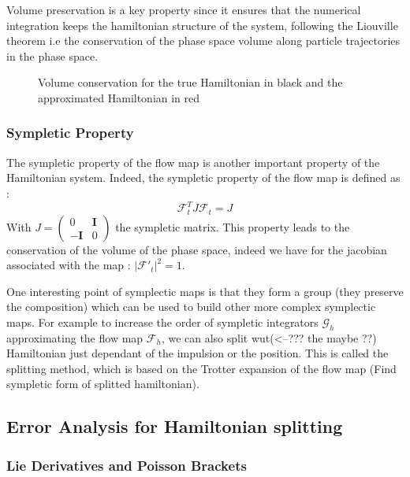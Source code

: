 \documentclass[ansiapaper]{report}
\begin{document}
\begin{multicols}{3}
  Volume preservation is a key property since it ensures that the numerical integration keeps the hamiltonian structure of the system, following the Liouville theorem i.e the conservation of the phase space volume along particle trajectories in the phase space.

  \begin{figure}[H]
    \def\svgwidth{\linewidth}
    
    \caption{Volume conservation for the true Hamiltonian in black and the approximated Hamiltonian in red}
    \vspace{0.15cm}
  \end{figure}

  \subsubsection{Sympletic Property}
  The sympletic property of the flow map is another important property of the Hamiltonian system. Indeed, the sympletic property of the flow map is defined as :
  $$ \mathcal{F}_t^T J \mathcal{F}_t = J$$
  With $J = \begin{pmatrix}
      0           & \textbf{I} \\
      -\textbf{I} & 0
    \end{pmatrix}$ the sympletic matrix. This property leads to the conservation of the volume of the phase space, indeed we have  for the jacobian associated with the map : $\lvert \mathcal{F'}_t\rvert^2 = 1 $.

  One interesting point of symplectic maps is that they form a group (they preserve the composition) which can be used to build other more complex symplectic maps. For example to increase the order of sympletic integrators $\mathcal{G}_h$  approximating the flow map $\mathcal{F}_h$, we can also split wut(<--??? the maybe ??) Hamiltonian just dependant of the impulsion or the position. This is called the splitting method, which is based on the Trotter expansion of the flow map (Find sympletic form of splitted hamiltonian).

  \subsection{Error Analysis for Hamiltonian splitting}


  \subsubsection{Lie Derivatives and Poisson Brackets}


\end{multicols}
\end{document}
